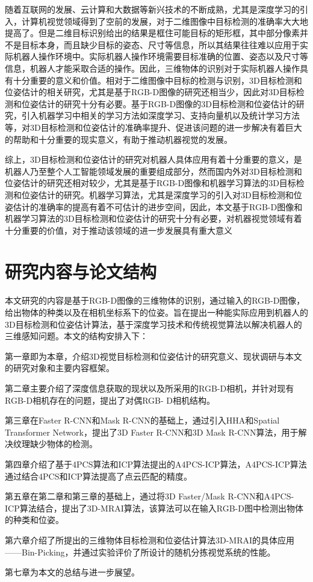 随着互联网的发展、云计算和大数据等新兴技术的不断成熟，尤其是深度学习的引入，计算机视觉领域得到了空前的发展，对于二维图像中目标检测的准确率大大地提高了。但是二维目标识别给出的结果是框住可能目标的矩形框，其中部分像素并不是目标本身，而且缺少目标的姿态、尺寸等信息，所以其结果往往难以应用于实际机器人操作环境中。实际机器人操作环境需要目标准确的位置、姿态以及尺寸等信息，机器人才能采取合适的操作。因此，三维物体的识别对于实际机器人操作具有十分重要的意义和价值。相对于二维图像中目标的检测与识别，3D目标检测和位姿估计的相关研究，尤其是基于RGB-D图像的研究还相当少，因此对3D目标检测和位姿估计的研究十分有必要。基于RGB-D图像的3D目标检测和位姿估计的研究，引入机器学习中相关的学习方法如深度学习、支持向量机以及统计学习方法等，对3D目标检测和位姿估计的准确率提升、促进该问题的进一步解决有着巨大的帮助和十分重要的现实意义，有助于推动机器视觉的发展。

综上，3D目标检测和位姿估计的研究对机器人具体应用有着十分重要的意义，是机器人乃至整个人工智能领域发展的重要组成部分，然而国内外对3D目标检测和位姿估计的研究还相对较少，尤其是基于RGB-D图像和机器学习算法的3D目标检测和位姿估计的研究。机器学习算法，尤其是深度学习的引入对3D目标检测和位姿估计的准确率的提高有着不可估计的进步空间，因此，本文基于RGB-D图像和机器学习算法的3D目标检测和位姿估计的研究十分有必要，对机器视觉领域有着十分重要的价值，对于推动该领域的进一步发展具有重大意义

\section{研究内容与论文结构}
本文研究的内容是基于RGB-D图像的三维物体的识别，通过输入的RGB-D图像，给出物体的种类以及在相机坐标系下的位姿。旨在提出一种能实际应用到机器人的3D目标检测和位姿估计算法，基于深度学习技术和传统视觉算法以解决机器人的三维感知问题。本文的结构安排入下：

第一章即为本章，介绍3D视觉目标检测和位姿估计的研究意义、现状调研与本文的研究对象和主要内容框架。

第二章主要介绍了深度信息获取的现状以及所采用的RGB-D相机，并针对现有RGB-D相机存在的问题，提出了对偶RGB-
D相机结构。

第三章在Faster R-CNN和Mask R-CNN的基础上，通过引入HHA和Spatial Transformer Network，提出了3D Faster R-CNN和3D Mask R-CNN算法，用于解决纹理缺少物体的检测。

第四章介绍了基于4PCS算法和ICP算法提出的A4PCS-ICP算法，A4PCS-ICP算法通过结合4PCS和ICP算法提高了点云匹配的精度。

第五章在第二章和第三章的基础上，通过将3D Faster/Mask R-CNN和A4PCS-ICP算法结合，提出了3D-MRAI算法，该算法可以在输入RGB-D图中检测出物体的种类和位姿。

第六章介绍了所提出的三维物体目标检测和位姿估计算法3D-MRAI的具体应用——Bin-Picking，并通过实验评价了所设计的随机分拣视觉系统的性能。

第七章为本文的总结与进一步展望。

